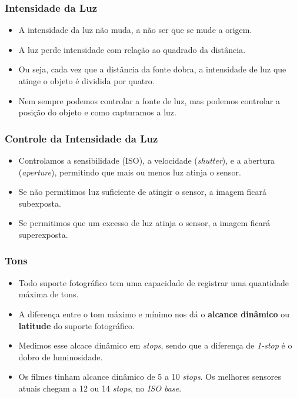 
\begin{frame}
    \frametitle{Intensidade da Luz}
    \begin{itemize}
      \item A intensidade da luz não muda, a não ser que se mude a origem.
      \item A luz perde intensidade com relação ao quadrado da distância.
      \item Ou seja, cada vez que a distância da fonte dobra, a intensidade
      de luz que atinge o objeto é dividida por quatro.
      \item Nem sempre podemos controlar a fonte de luz, mas podemos controlar
      a posição do objeto e como capturamos a luz.
    \end{itemize}
\end{frame}

\begin{frame}
    \frametitle{Controle da Intensidade da Luz}
    \begin{itemize}
      \item Controlamos a sensibilidade (ISO), a velocidade (\textit{shutter}),
      e a abertura (\textit{aperture}), permitindo que mais ou menos luz atinja o sensor.
      \item Se não permitimos luz suficiente de atingir o sensor, a imagem ficará subexposta.
      \item Se permitimos que um excesso de luz atinja o sensor, a imagem ficará superexposta.
    \end{itemize}
\end{frame}




\begin{frame}
    \frametitle{Tons}
    \begin{itemize}
      \item Todo suporte fotográfico tem uma capacidade de registrar uma quantidade máxima de tons.
      \item A diferença entre o tom máximo e mínimo nos dá o \textbf{alcance dinâmico} ou \textbf{latitude}
      do suporte fotográfico.
      \item Medimos esse alcace dinâmico em \textit{stops}, sendo que a diferença de \textit{1-stop} é o dobro
      de luminosidade.
      \item Os filmes tinham alcance dinâmico de 5 a 10 \textit{stops}. Os melhores sensores atuais
      chegam a 12 ou 14 \textit{stops}, no \textit{ISO base}.
    \end{itemize}
\end{frame}

